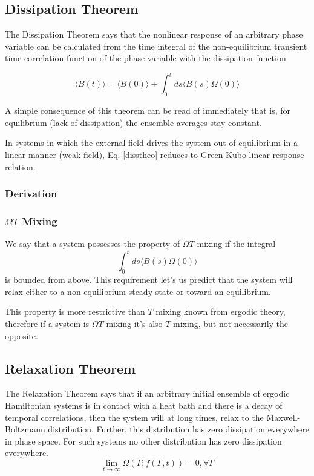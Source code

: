 \documentclass[a4paper,12pt,nofootinbib]{article}
\begin{document}
\subsection{Dissipation Theorem}
The Dissipation Theorem says that the nonlinear response of an arbitrary phase variable can be calculated from the time integral of the non-equilibrium transient time correlation function of the phase variable with the dissipation function


\begin{equation}
\langle B(t)\rangle =\langle B(0) \rangle +\int_0^t ds \langle B(s) \Omega(0) \rangle \label{disstheo}
\end{equation}

A simple consequence of this theorem can be read of immediately that is, for equilibrium (lack of dissipation) the ensemble averages stay constant.

In systems in which the external field drives the system out of equilibrium in a linear manner (weak field), Eq. \ref{disstheo} reduces to Green-Kubo linear response relation.

\subsubsection{Derivation}

\subsubsection{$\Omega T$ Mixing}

We say that a system possesses the property of $\Omega T$ mixing if the integral
\begin{equation}
  \int_0^t ds \langle B(s) \Omega(0) \rangle
\end{equation}
is bounded from above. This requirement let's us predict that the system will relax either to a non-equilibrium steady state or toward an equilibrium.

This property is more restrictive than $T$ mixing known from ergodic theory, therefore if a system is $\Omega T$ mixing it's also $T$ mixing, but not necessarily the opposite.

\subsection{Relaxation Theorem}
The Relaxation Theorem says that if an arbitrary initial ensemble of ergodic Hamiltonian systems is in contact with a heat bath and there is a decay of temporal correlations, then the system will at long times, relax to the Maxwell-Boltzmann distribution. Further, this distribution has zero dissipation everywhere in phase space. For such systems no other distribution has zero dissipation everywhere.
\begin{displaymath}
  \lim_{t\to \infty } \Omega (\Gamma ;f(\Gamma ,t))=0, \forall \Gamma
\end{displaymath}
\end{document}

